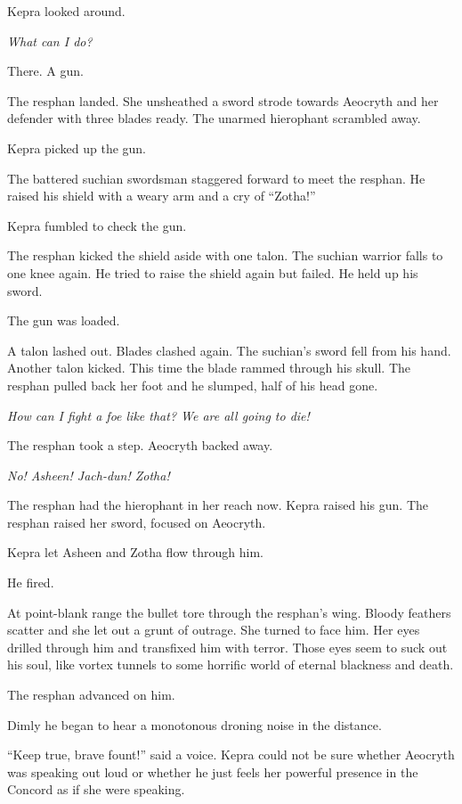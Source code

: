 \documentclass
  [a4paper,
   12pt,
   oneside
  ]%
  {article}
\begin{document}
Kepra looked around. 

\emph{What can I do?}

There. A gun. 

The resphan landed. She unsheathed a sword strode towards Aeocryth and her defender with three blades ready. The unarmed hierophant scrambled away. 

Kepra picked up the gun. 

The battered suchian swordsman staggered forward to meet the resphan. He raised his shield with a weary arm and a cry of ``Zotha!''

Kepra fumbled to check the gun. 

The resphan kicked the shield aside with one talon. 
The suchian warrior falls to one knee again. 
He tried to raise the shield again but failed. 
He held up his sword. 

The gun was loaded.

A talon lashed out. Blades clashed again. The suchian’s sword fell from his hand. Another talon kicked. This time the blade rammed through his skull. 
The resphan pulled back her foot and he slumped, half of his head gone.

\emph{How can I fight a foe like that? We are all going to die!}

The resphan took a step. Aeocryth backed away.

\emph{No! Asheen! Jach-dun! Zotha!}

The resphan had the hierophant in her reach now.
Kepra raised his gun. 
The resphan raised her sword, focused on Aeocryth. 

Kepra let Asheen and Zotha flow through him. 

He fired. 

At point-blank range the bullet tore through the resphan’s wing. 
Bloody feathers scatter and she let out a grunt of outrage. 
She turned to face him. 
Her eyes drilled through him and transfixed him with terror. 
Those eyes seem to suck out his soul, like vortex tunnels to some horrific world of eternal blackness and death. 

The resphan advanced on him. 

Dimly he began to hear a monotonous droning noise in the distance.

``Keep true, brave fount!'' said a voice. Kepra could not be sure whether Aeocryth was speaking out loud or whether he just feels her powerful presence in the Concord as if she were speaking. 
\end{document}
